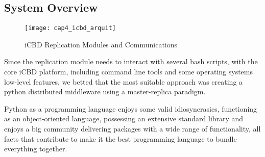 




\subsection{System Overview}
\label{sub:impl_system_overview}


\begin{figure}[htbp]
	\centering
	\texttt{[image: cap4\_icbd\_arquit]}
	\caption{iCBD Replication Modules and Communications}
	\label{fig:icbd_rep_mods_comms}
\end{figure}

Since the replication module needs to interact with several bash scripts, with the core iCBD platform, including command line tools and some operating systems low-level features, we betted that the most suitable approach was creating a python distributed middleware using a master-replica paradigm.

Python as a programming language enjoys some valid idiosyncrasies, functioning as an object-oriented language, possessing an extensive standard library and enjoys a big community delivering packages with a wide range of functionality, all facts that contribute to make it the best programming language to bundle everything together.

